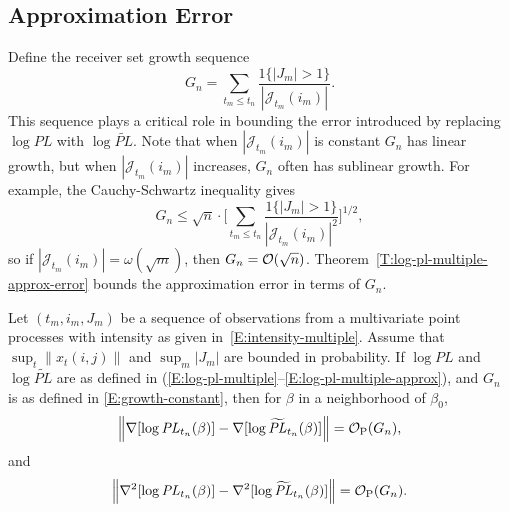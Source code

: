 \documentclass[final]{statsoc}
\begin{document}
\subsection{Approximation Error}\label{S:approximation-error}
Define the receiver set growth sequence
\begin{equation}\label{E:growth-constant}
    G_n
        =
            \sum_{t_m \leq t_n}
                \frac{1\{|J_m| > 1\}}{|\mathcal{J}_{t_m}(i_m)|}.
\end{equation}
This sequence plays a critical role in bounding the error introduced by
replacing $\log \mathit{PL}$ with $\log \widetilde{\mathit{PL}}$.
Note that when $|\mathcal{J}_{t_m}(i_m)|$ is constant $G_n$ has linear
growth, but when $|\mathcal{J}_{t_m}(i_m)|$ increases, $G_n$ often has
sublinear growth.  For example, the Cauchy-Schwartz inequality gives
\[
    G_n
        \leq
            \sqrt{n}
            \cdot
            \bigg[
                \sum_{t_m \leq t_n}
                    \frac{1\{|J_m| > 1\}}{|\mathcal{J}_{t_m}(i_m)|^2}
            \bigg]^{1/2},
\]
so if $|\mathcal{J}_{t_m}(i_m)| = \omega(\sqrt{m})$, then
$G_n = \mathcal{O}(\sqrt{n})$.  Theorem~\ref{T:log-pl-multiple-approx-error} bounds
the approximation error in terms of $G_n$.

\begin{theorem}\label{T:log-pl-multiple-approx-error}
    Let $(t_m, i_m, J_m)$ be a sequence of observations from a multivariate
    point processes with intensity as given in~\eqref{E:intensity-multiple}.
    Assume that
    \(
        \sup_t \| x_t (i,j) \|
    \)
    and
    \(
        \sup_m | J_m |
    \)
    are bounded in probability.
    If $\log \mathit{PL}$ and $\log \widetilde{\mathit{PL}}$ are as
    defined in
    \textnormal{(}\ref{E:log-pl-multiple}--\ref{E:log-pl-multiple-approx}\textnormal{)},
    and $G_n$ is as defined in \eqref{E:growth-constant},
    then for $\beta$ in a neighborhood of $\beta_0$,
    \[
        \Big\|
        \nabla [\log \mathit{PL}_{t_n}(\beta) ]
        -
        \nabla [\log \widetilde{\mathit{PL}}_{t_n}(\beta) ]
        \Big\|
            =
            \mathcal{O}_\text{P}(G_n),
    \]
    and
    \[
        \Big\|
        \nabla^2 [\log \mathit{PL}_{t_n}(\beta) ]
        -
        \nabla^2 [\log \widetilde{\mathit{PL}}_{t_n}(\beta) ]
        \Big\|
            =
            \mathcal{O}_\text{P}(G_n).
    \]
\end{theorem}
\end{document}
